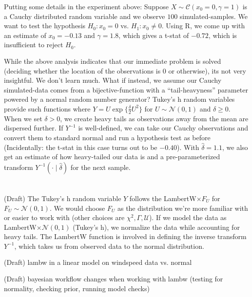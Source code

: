 \documentclass{article}
\begin{document}
Putting some details in the experiment above: Suppose $X \sim \mathcal{C}(x_0 =0,\gamma=1)$ is a Cauchy distributed random variable and we observe $100$ simulated-samples. We want to test the hypothesis $H_0: x_0 = 0$ vs. $H_1: x_0 \neq 0$. Using R, we come up with an estimate of $x_0 = -0.13$ and $\gamma=1.8$, which gives a t-stat of $-0.72$, which is insufficient to reject $H_0$.

While the above analysis indicates that our immediate problem is solved (deciding whether the location of the observations is 0 or otherwise), its not very insightful. We don't learn much. What if instead, we assume our Cauchy simulated-data comes from a bijective-function with a ``tail-heavyness'' parameter powered by a normal random number generator? Tukey's h random variables provide such functions where $Y = U\exp\{\frac{\delta}{2}U^2\}$ for $U\sim \mathcal{N}(0,1)$ and $\delta \geq 0$. When we set $\delta > 0$, we create heavy tails as observations away from the mean are dispersed further. If $Y^{-1}$ is well-defined, we can take our Cauchy observations and convert them to standard normal and run a hypothesis test as before (Incidentally: the t-stat in this case turns out to be $-0.40$). With $\hat{\delta} = 1.1$, we also get an estimate of how heavy-tailed our data is and a pre-parameterized transform $Y^{-1}(\cdot \mid \hat{\delta})$ for the next sample.

\section{}


(Draft) The Tukey's h random variable $Y$ follows the LambertW$ \times F_U$ for $F_U \sim \mathcal{N}(0,1)$. We would choose $F_U$ as the distribution we're more familiar with or easier to work with (other choices are $\chi^2, \Gamma, \mathcal{U}$). If we model the data as  LambertW$ \times \mathcal{N}(0,1)$ (Tukey's h), we normalize the data while accounting for heavy tails. The LambertW function is involved in defining the inverse transform $Y^{-1}$, which takes us from observed data to the normal distribution.

(Draft) lambw in a linear model on windspeed data vs. normal 

(Draft) bayesian workflow changes when working with lambw (testing for normality, checking prior, running model checks)
\end{document}
